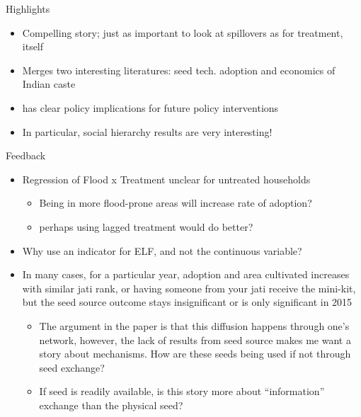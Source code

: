 \documentclass{beamer}
\begin{document}
\begin{frame}{Highlights}
    \begin{itemize}
        \item Compelling story; just as important to look at spillovers as for treatment, itself
        \item Merges two interesting literatures: seed tech. adoption and economics of Indian caste
        \item has clear policy implications for future policy 
        interventions 
        \item In particular, social hierarchy results are very interesting!
    \end{itemize}    
\end{frame}

\begin{frame}{Feedback}
    \begin{itemize}
        \item Regression of Flood x Treatment unclear for untreated households
            \begin{itemize}
                \item Being in more flood-prone areas will increase rate of adoption?
                \item perhaps using lagged treatment would do better?
            \end{itemize}
        \item Why use an indicator for ELF, and not the continuous variable?
        \item In many cases, for a particular year, adoption and area cultivated increases with similar jati rank, or having someone from your jati receive the mini-kit, but the seed source outcome stays insignificant or is only significant in 2015
            \begin{itemize}
                \item The argument in the paper is that this diffusion happens through one's network, however, the lack of results from seed source makes me want a story about mechanisms. How are these seeds being used if not through seed exchange?
                \item If seed is readily available, is this story more about ``information'' exchange than the physical seed?
            \end{itemize}
    \end{itemize}
\end{frame}
\end{document}
